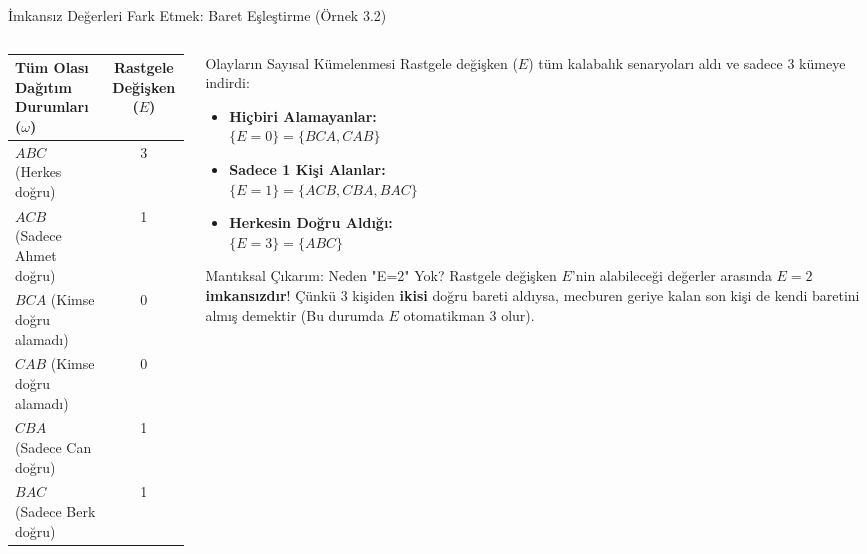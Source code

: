 \documentclass[light]{lutbeamer}
\begin{document}
\begin{frame}{İmkansız Değerleri Fark Etmek: Baret Eşleştirme (Örnek 3.2)}
\begin{columns}[T]
\begin{column}{0.54\textwidth}
    \centering
    \begin{tabular}{lc}
      \toprule
      Tüm Olası Dağıtım Durumları ($\omega$) & Rastgele Değişken ($E$) \\
      \midrule
      $ABC$ (Herkes doğru) & 3 \\
      $ACB$ (Sadece Ahmet doğru) & 1 \\
      $BCA$ (Kimse doğru alamadı) & 0 \\
      $CAB$ (Kimse doğru alamadı) & 0 \\
      $CBA$ (Sadece Can doğru) & 1 \\
      $BAC$ (Sadece Berk doğru) & 1 \\
      \bottomrule
    \end{tabular}
  \end{column}
  \vspace{-1cm}
  \begin{column}{0.44\textwidth}
    \begin{block}{Olayların Sayısal Kümelenmesi}
      Rastgele değişken ($E$) tüm kalabalık senaryoları aldı ve sadece 3 kümeye indirdi:
      \begin{itemize}
        \item \textbf{Hiçbiri Alamayanlar:} \\ $\{E=0\} = \{BCA, CAB\}$
        \item \textbf{Sadece 1 Kişi Alanlar:} \\ $\{E=1\} = \{ACB, CBA, BAC\}$
        \item \textbf{Herkesin Doğru Aldığı:} \\ $\{E=3\} = \{ABC\}$
      \end{itemize}
    \end{block}
    \begin{alertblock}{Mantıksal Çıkarım: Neden "E=2" Yok?}
      Rastgele değişken $E$'nin alabileceği değerler arasında $E=2$ \textbf{imkansızdır}! 
      Çünkü 3 kişiden \textbf{ikisi} doğru bareti aldıysa, mecburen geriye kalan son kişi de kendi baretini almış demektir (Bu durumda $E$ otomatikman 3 olur).
    \end{alertblock}
  \end{column}
\end{columns}
\end{frame}
\end{document}
